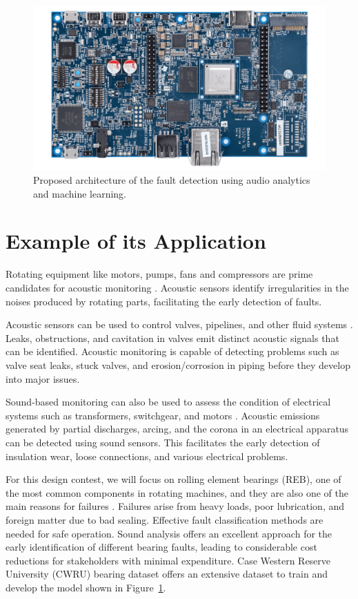 \documentclass[12pt]{article}
\begin{document}
\begin{figure}[htb]
\centering
\includegraphics[width=1.0\linewidth]{figs/TI.png}
\caption{\label{fig:arch1}Proposed architecture of the fault detection using audio analytics and machine learning.}
\end{figure}


\section{Example of its Application}
Rotating equipment like motors, pumps, fans and compressors are prime candidates for acoustic monitoring \cite{judith2017}. Acoustic sensors identify irregularities in the noises produced by rotating parts, facilitating the early detection of faults.

Acoustic sensors can be used to control valves, pipelines, and other fluid systems \cite{judith2017}. Leaks, obstructions, and cavitation in valves emit distinct acoustic signals that can be identified. Acoustic monitoring is capable of detecting problems such as valve seat leaks, stuck valves, and erosion/corrosion in piping before they develop into major issues.

Sound-based monitoring can also be used to assess the condition of electrical systems such as transformers, switchgear, and motors \cite{avinton2023}. Acoustic emissions generated by partial discharges, arcing, and the corona in an electrical apparatus can be detected using sound sensors. This facilitates the early detection of insulation wear, loose connections, and various electrical problems.

For this design contest, we will focus on rolling element bearings (REB), one of the most common components in rotating machines, and they are also one of the main reasons for failures \cite{jiang2019bearing}. 
Failures arise from heavy loads, poor lubrication, and foreign matter due to bad sealing. Effective fault classification methods are needed for safe operation. Sound analysis offers an excellent approach for the early identification of different bearing faults, leading to considerable cost reductions for stakeholders with minimal expenditure. Case Western Reserve University (CWRU) bearing dataset \cite{case2019} offers an extensive dataset to train and develop the model shown in Figure~\ref{fig:arch1}. 
\end{document}
